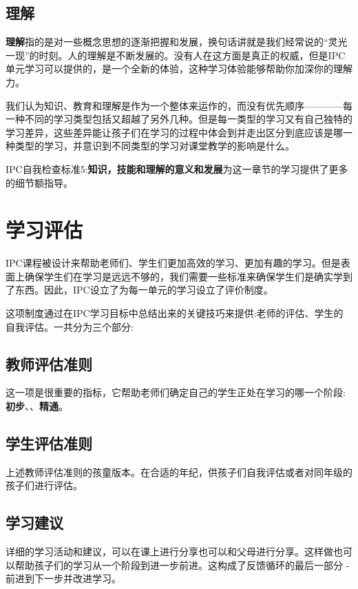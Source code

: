 \subsection{理解}
     \textbf{理解}指的是对一些概念思想的逐渐把握和发展，换句话讲就是我们经常说的“灵光一现”的时刻。人的理解是不断发展的。没有人在这方面是真正的权威，但是IPC单元学习可以提供的，是一个全新的体验，这种学习体验能够帮助你加深你的理解力。\par
     我们认为知识、教育和理解是作为一个整体来运作的，而没有优先顺序————每一种不同的学习类型包括又超越了另外几种。但是每一类型的学习又有自己独特的学习差异，这些差异能让孩子们在学习的过程中体会到并走出区分到底应该是哪一种类型的学习，并意识到不同类型的学习对课堂教学的影响是什么。\par
     IPC自我检查标准5:\textbf{知识，技能和理解的意义和发展}为这一章节的学习提供了更多的细节额指导。 \par

\section{学习评估}
    IPC课程被设计来帮助老师们、学生们更加高效的学习、更加有趣的学习。但是表面上确保学生们在学习是远远不够的，我们需要一些标准来确保学生们是确实学到了东西。因此，IPC设立了为每一单元的学习设立了评价制度。\par
    这项制度通过在IPC学习目标中总结出来的关键技巧来提供:老师的评估、学生的自我评估。一共分为三个部分:   \par

\subsection{教师评估准则}    
    这一项是很重要的指标，它帮助老师们确定自己的学生正处在学习的哪一个阶段:\textbf{初步}、、\textbf{精通}。

\subsection{学生评估准则}
    上述教师评估准则的孩童版本。在合适的年纪，供孩子们自我评估或者对同年级的孩子们进行评估。

\subsection{学习建议}
    详细的学习活动和建议，可以在课上进行分享也可以和父母进行分享。这样做也可以帮助孩子们的学习从一个阶段到进一步前进。这构成了反馈循环的最后一部分 - 前进到下一步并改进学习。\par
    
